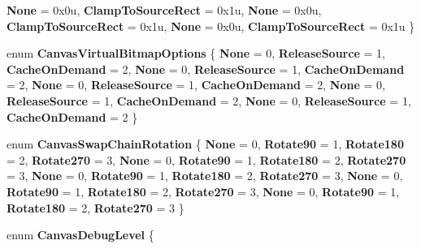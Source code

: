 \begin{DoxyCompactItemize}
\newline
{\bfseries None} = 0x0u, 
{\bfseries Clamp\+To\+Source\+Rect} = 0x1u, 
{\bfseries None} = 0x0u, 
{\bfseries Clamp\+To\+Source\+Rect} = 0x1u, 
\newline
{\bfseries None} = 0x0u, 
{\bfseries Clamp\+To\+Source\+Rect} = 0x1u
 \}
\item 
\mbox{\label{namespace_microsoft_1_1_graphics_1_1_canvas_a1a98137e8da81a9cc6c342d3aadbd14b}} 
enum {\bfseries Canvas\+Virtual\+Bitmap\+Options} \{ \newline
{\bfseries None} = 0, 
{\bfseries Release\+Source} = 1, 
{\bfseries Cache\+On\+Demand} = 2, 
{\bfseries None} = 0, 
\newline
{\bfseries Release\+Source} = 1, 
{\bfseries Cache\+On\+Demand} = 2, 
{\bfseries None} = 0, 
{\bfseries Release\+Source} = 1, 
\newline
{\bfseries Cache\+On\+Demand} = 2, 
{\bfseries None} = 0, 
{\bfseries Release\+Source} = 1, 
{\bfseries Cache\+On\+Demand} = 2, 
\newline
{\bfseries None} = 0, 
{\bfseries Release\+Source} = 1, 
{\bfseries Cache\+On\+Demand} = 2
 \}
\item 
\mbox{\label{namespace_microsoft_1_1_graphics_1_1_canvas_a1cf1111048d43d97b2294d0ff727e25c}} 
enum {\bfseries Canvas\+Swap\+Chain\+Rotation} \{ \newline
{\bfseries None} = 0, 
{\bfseries Rotate90} = 1, 
{\bfseries Rotate180} = 2, 
{\bfseries Rotate270} = 3, 
\newline
{\bfseries None} = 0, 
{\bfseries Rotate90} = 1, 
{\bfseries Rotate180} = 2, 
{\bfseries Rotate270} = 3, 
\newline
{\bfseries None} = 0, 
{\bfseries Rotate90} = 1, 
{\bfseries Rotate180} = 2, 
{\bfseries Rotate270} = 3, 
\newline
{\bfseries None} = 0, 
{\bfseries Rotate90} = 1, 
{\bfseries Rotate180} = 2, 
{\bfseries Rotate270} = 3, 
\newline
{\bfseries None} = 0, 
{\bfseries Rotate90} = 1, 
{\bfseries Rotate180} = 2, 
{\bfseries Rotate270} = 3
 \}
\item 
\mbox{\label{namespace_microsoft_1_1_graphics_1_1_canvas_a2ef0aec53b3f7fd6d2b7d2fe3f4cec34}} 
enum {\bfseries Canvas\+Debug\+Level} \{ \newline

\end{DoxyCompactItemize}
